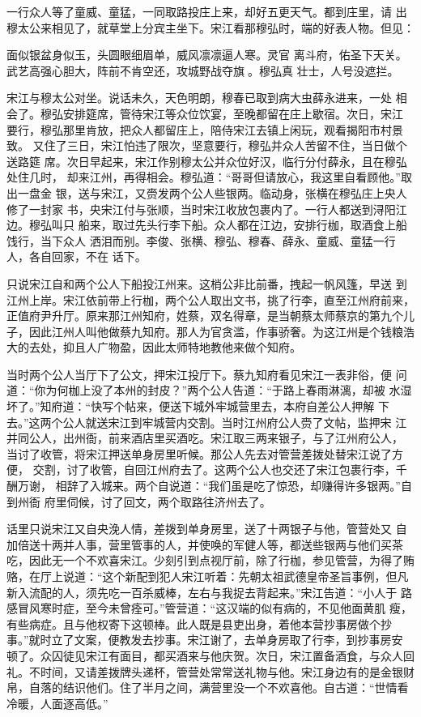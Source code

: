 一行众人等了童威、童猛，一同取路投庄上来，却好五更天气。都到庄里，请
出穆太公来相见了，就草堂上分宾主坐下。宋江看那穆弘时，端的好表人物。但见：

面似银盆身似玉，头圆眼细眉单，威风凛凛逼人寒。灵官
离斗府，佑圣下天关。武艺高强心胆大，阵前不肯空还，攻城野战夺旗。穆弘真
壮士，人号没遮拦。

宋江与穆太公对坐。说话未久，天色明朗，穆春已取到病大虫薛永进来，一处
相会了。穆弘安排筵席，管待宋江等众位饮宴，至晚都留在庄上歇宿。次日，宋江
要行，穆弘那里肯放，把众人都留庄上，陪侍宋江去镇上闲玩，观看揭阳市村景致。
又住了三日，宋江怕违了限次，坚意要行，穆弘并众人苦留不住，当日做个送路筵
席。次日早起来，宋江作别穆太公并众位好汉，临行分付薛永，且在穆弘处住几时，
却来江州，再得相会。穆弘道：“哥哥但请放心，我这里自看顾他。”取出一盘金
银，送与宋江，又赍发两个公人些银两。临动身，张横在穆弘庄上央人修了一封家
书，央宋江付与张顺，当时宋江收放包裹内了。一行人都送到浔阳江边。穆弘叫只
船来，取过先头行李下船。众人都在江边，安排行枷，取酒食上船饯行，当下众人
洒泪而别。李俊、张横、穆弘、穆春、薛永、童威、童猛一行人，各自回家，不在
话下。

只说宋江自和两个公人下船投江州来。这梢公非比前番，拽起一帆风篷，早送
到江州上岸。宋江依前带上行枷，两个公人取出文书，挑了行李，直至江州府前来，
正值府尹升厅。原来那江州知府，姓蔡，双名得章，是当朝蔡太师蔡京的第九个儿
子，因此江州人叫他做蔡九知府。那人为官贪滥，作事骄奢。为这江州是个钱粮浩
大的去处，抑且人广物盈，因此太师特地教他来做个知府。

当时两个公人当厅下了公文，押宋江投厅下。蔡九知府看见宋江一表非俗，便
问道：“你为何枷上没了本州的封皮？”两个公人告道：“于路上春雨淋漓，却被
水湿坏了。”知府道：“快写个帖来，便送下城外牢城营里去，本府自差公人押解
下去。”这两个公人就送宋江到牢城营内交割。当时江州府公人赍了文帖，监押宋
江并同公人，出州衙，前来酒店里买酒吃。宋江取三两来银子，与了江州府公人，
当讨了收管，将宋江押送单身房里听候。那公人先去对管营差拨处替宋江说了方便，
交割，讨了收管，自回江州府去了。这两个公人也交还了宋江包裹行李，千酬万谢，
相辞了入城来。两个自说道：“我们虽是吃了惊恐，却赚得许多银两。”自到州衙
府里伺候，讨了回文，两个取路往济州去了。

话里只说宋江又自央浼人情，差拨到单身房里，送了十两银子与他，管营处又
自加倍送十两并人事，营里管事的人，并使唤的军健人等，都送些银两与他们买茶
吃，因此无一个不欢喜宋江。少刻引到点视厅前，除了行枷，参见管营，为得了贿
赂，在厅上说道：“这个新配到犯人宋江听着：先朝太祖武德皇帝圣旨事例，但凡
新入流配的人，须先吃一百杀威棒，左右与我捉去背起来。”宋江告道：“小人于
路感冒风寒时症，至今未曾痊可。”管营道：“这汉端的似有病的，不见他面黄肌
瘦，有些病症。且与他权寄下这顿棒。此人既是县吏出身，着他本营抄事房做个抄
事。”就时立了文案，便教发去抄事。宋江谢了，去单身房取了行李，到抄事房安
顿了。众囚徒见宋江有面目，都买酒来与他庆贺。次日，宋江置备酒食，与众人回
礼。不时间，又请差拨牌头递杯，管营处常常送礼物与他。宋江身边有的是金银财
帛，自落的结识他们。住了半月之间，满营里没一个不欢喜他。自古道：“世情看
冷暖，人面逐高低。”

